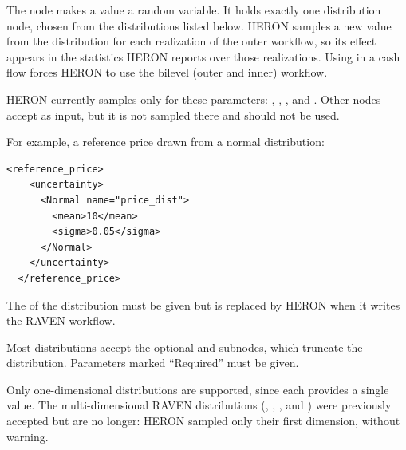 The  node makes a value a random variable. It holds exactly one distribution
node, chosen from the distributions listed below. HERON samples a new value from the distribution
for each realization of the outer workflow, so its effect appears in the statistics HERON reports
over those realizations. Using  in a cash flow forces HERON to use the bilevel
(outer and inner) workflow.

HERON currently samples  only for these  parameters:
, , , and
. Other nodes accept  as input, but it is not
sampled there and should not be used.

For example, a reference price drawn from a normal distribution:
\begin{lstlisting}[style=XML]
  <reference_price>
    <uncertainty>
      <Normal name="price_dist">
        <mean>10</mean>
        <sigma>0.05</sigma>
      </Normal>
    </uncertainty>
  </reference_price>
\end{lstlisting}
The  of the distribution must be given but is replaced by HERON when it writes the
RAVEN workflow.

Most distributions accept the optional  and  subnodes,
which truncate the distribution. Parameters marked ``Required'' must be given.

Only one-dimensional distributions are supported, since each  provides a single
value. The multi-dimensional RAVEN distributions (,
, , and )
were previously accepted but are no longer: HERON sampled only their first dimension, without warning.

